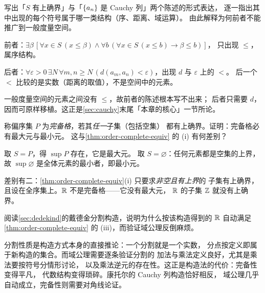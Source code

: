 \begin{exercise}[延伸]
  \label{exr:cauchy-vs-sup}
  写出「\(S\) 有上确界」与「\(\{a_{n}\}\) 是 Cauchy 列」两个陈述的形式表达，
  逐一指出其中出现的每个符号属于哪一类结构（序、距离、域运算）。
  由此解释为何前者不能推广到一般度量空间。
  \begin{solution}
    前者：\(\exists \beta\,[\forall x \in S\,(x \le \beta) \wedge
    \forall b\,(\forall x \in S\,(x \le b) \to \beta \le b)]\)，
    只出现 \(\le\)，属序结构。

    后者：\(\forall \varepsilon > 0\,\exists N\,\forall m,n \ge N\,
    (d(a_{m},a_{n}) < \varepsilon)\)，出现 \(d\) 与 \(\varepsilon\) 上的 \(<\)。
    后一个 \(<\) 比较的是实数（距离的取值），不是空间中的元素。

    一般度量空间的元素之间没有 \(\le\)，故前者的陈述根本写不出来；
    后者只需要 \(d\)，因而可原样移植。这正是\cref{sec:cauchy}末尾「本章的核心」一节所论。
  \end{solution}
\end{exercise}

\begin{exercise}[延伸]
  \label{exr:sup-lattice}
  称偏序集 \(P\) 为\emph{完备格}，若其\emph{任一}子集（包括空集）
  都有上确界。证明：完备格必有最大元与最小元。
  这与\cref{thm:order-complete-equiv} 的 (i) 有何差别？
  \begin{solution}
    取 \(S = P\)，得 \(\sup P\) 存在，它是最大元。
    取 \(S = \varnothing\)：任何元素都是空集的上界，故 \(\sup \varnothing\)
    是全体元素的最小者，即最小元。

    差别有二：\cref{thm:order-complete-equiv}(i) 只要求\emph{非空且有上界}的
    子集有上确界，且设在全序集上。\(\mathbb{R}\) 不是完备格——它没有最大元，
    \(\mathbb{R}\) 的子集 \(\mathbb{Z}\) 就没有上确界。
  \end{solution}
\end{exercise}

\begin{exercise}[延伸]
  \label{exr:construction}
  阅读\cref{sec:dedekind}的戴德金分割构造，说明为什么按该构造得到的 \(\mathbb{R}\)
  自动满足\cref{thm:order-complete-equiv} 的 (iii)，而验证域公理反倒麻烦。
  \begin{solution}
    分割性质是构造方式本身的直接推论：一个分割就是一个实数，
    分点按定义即属于新构造的集合。而域公理需要逐条验证分割的
    加法与乘法定义良好，尤其是乘法要按符号分情形讨论，
    以及乘法逆元的存在性。这正是构造法的代价：完备性变得平凡，
    代数结构变得琐碎。康托尔的 Cauchy 列构造恰好相反，
    域公理几乎自动成立，完备性则需要对角线论证。
  \end{solution}
\end{exercise}
